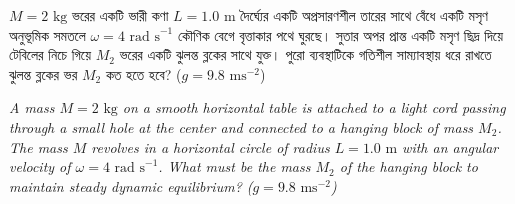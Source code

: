 \documentclass[12pt, a4paper]{article}
\begin{document}
\newpage

\begin{tcolorbox}[questionbox={প্রশ্ন (Question) 15}]
    \noindent
    $M = 2\text{ kg}$ ভরের একটি ভারী কণা $L = 1.0\text{ m}$ দৈর্ঘ্যের একটি অপ্রসারণশীল তারের সাথে বেঁধে একটি মসৃণ অনুভূমিক সমতলে $\omega = 4\text{ rad s}^{-1}$ কৌণিক বেগে বৃত্তাকার পথে ঘুরছে। সুতার অপর প্রান্ত একটি মসৃণ ছিদ্র দিয়ে টেবিলের নিচে গিয়ে $M_2$ ভরের একটি ঝুলন্ত ব্লকের সাথে যুক্ত। পুরো ব্যবস্থাটিকে গতিশীল সাম্যাবস্থায় ধরে রাখতে ঝুলন্ত ব্লকের ভর $M_2$ কত হতে হবে? ($g = 9.8\text{ ms}^{-2}$)
    
    \vspace{0.8em}
    \begin{english}
    \noindent\textit{\color{darkgray}
    A mass $M = 2\text{ kg}$ on a smooth horizontal table is attached to a light cord passing through a small hole at the center and connected to a hanging block of mass $M_2$. The mass $M$ revolves in a horizontal circle of radius $L = 1.0\text{ m}$ with an angular velocity of $\omega = 4\text{ rad s}^{-1}$. What must be the mass $M_2$ of the hanging block to maintain steady dynamic equilibrium? ($g = 9.8\text{ ms}^{-2}$)
    }
    \end{english}
\end{tcolorbox}
\end{document}
